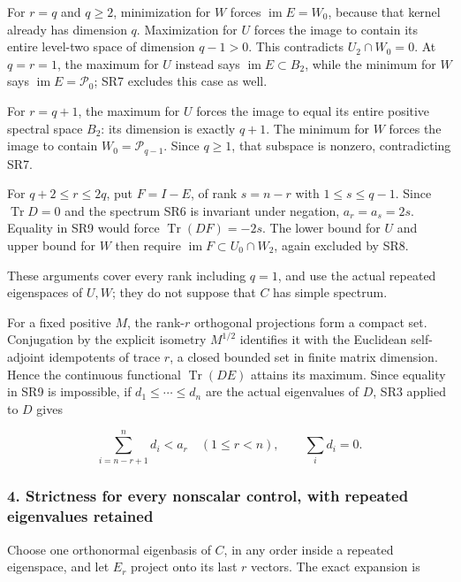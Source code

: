 \documentclass{article}
\begin{document}
For \(r=q\) and \(q\ge2\), minimization for \(W\) forces \(\operatorname{im}E=W_0\), because that kernel already has dimension \(q\). Maximization for \(U\) forces the image to contain its entire level-two space of dimension \(q-1>0\). This contradicts \(U_2\cap W_0=0\). At \(q=r=1\), the maximum for \(U\) instead says \(\operatorname{im}E\subset B_2\), while the minimum for \(W\) says \(\operatorname{im}E=\mathcal P_0\); SR7 excludes this case as well.

For \(r=q+1\), the maximum for \(U\) forces the image to equal its entire positive spectral space \(B_2\): its dimension is exactly \(q+1\). The minimum for \(W\) forces the image to contain \(W_0=\mathcal P_{q-1}\). Since \(q\ge1\), that subspace is nonzero, contradicting SR7.

For \(q+2\le r\le2q\), put \(F=I-E\), of rank \(s=n-r\) with \(1\le s\le q-1\). Since \(\operatorname{Tr}D=0\) and the spectrum SR6 is invariant under negation, \(a_r=a_s=2s\). Equality in SR9 would force \(\operatorname{Tr}(DF)=-2s\). The lower bound for \(U\) and upper bound for \(W\) then require \(\operatorname{im}F\subset U_0\cap W_2\), again excluded by SR8.

These arguments cover every rank including \(q=1\), and use the actual repeated eigenspaces of \(U,W\); they do not suppose that \(C\) has simple spectrum.

For a fixed positive \(M\), the rank-\(r\) orthogonal projections form a compact set. Conjugation by the explicit isometry \(M^{1/2}\) identifies it with the Euclidean self-adjoint idempotents of trace \(r\), a closed bounded set in finite matrix dimension. Hence the continuous functional \(\operatorname{Tr}(DE)\) attains its maximum. Since equality in SR9 is impossible, if \(d_1\le\cdots\le d_n\) are the actual eigenvalues of \(D\), SR3 applied to \(D\) gives

\[
\sum_{i=n-r+1}^{n}d_i<a_r\quad(1\le r<n),
\qquad \sum_i d_i=0.
\tag{SR10}
\]

\subsubsection{4. Strictness for every nonscalar control, with repeated eigenvalues retained}\label{endpoint-four_window_sharpness_review--strictness-for-every-nonscalar-control-with-repeated-eigenvalues-retained}

Choose one orthonormal eigenbasis of \(C\), in any order inside a repeated eigenspace, and let \(E_r\) project onto its last \(r\) vectors. The exact expansion is
\end{document}
